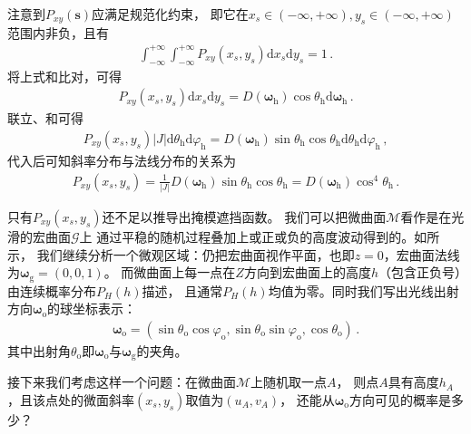 注意到$P_{xy}({\bm s})$应满足规范化约束，
即它在$x_s\in(-\infty,+\infty),y_s\in(-\infty,+\infty)$范围内非负，且有
\begin{align}\label{eq:08-ex01-normal-of-P2D}
    \int_{-\infty}^{+\infty}\int_{-\infty}^{+\infty}
    P_{xy}(x_s,y_s)\mathrm{d}x_s\mathrm{d}y_s=1\, .
\end{align}
将上式和比对，可得
\begin{align}\label{eq:08-ex01-P2D}
    P_{xy}(x_s,y_s)\mathrm{d}x_s\mathrm{d}y_s=
    D({\bm\omega}_{\mathrm{h}})\cos\theta_{\mathrm{h}}\mathrm{d}{\bm\omega}_{\mathrm{h}}\, .
\end{align}
联立、和可得
\begin{align}
    P_{xy}(x_s,y_s)|J|\mathrm{d}\theta_{\mathrm{h}}\mathrm{d}\varphi_{\mathrm{h}}
    =D({\bm\omega}_{\mathrm{h}})\sin\theta_{\mathrm{h}}\cos\theta_{\mathrm{h}}\mathrm{d}\theta_{\mathrm{h}}\mathrm{d}\varphi_{\mathrm{h}}\, ,
\end{align}
代入后可知斜率分布与法线分布的关系为
\begin{align}\label{eq:08-ex01-relation-P2D-McrofacetDistribution}
    P_{xy}(x_s,y_s)=\frac{1}{|J|}D({\bm\omega}_{\mathrm{h}})\sin\theta_{\mathrm{h}}\cos\theta_{\mathrm{h}}
    =D({\bm\omega}_{\mathrm{h}})\cos^4\theta_{\mathrm{h}}\, .
\end{align}

只有$P_{xy}(x_s,y_s)$还不足以推导出掩模遮挡函数。
我们可以把微曲面$\mathcal{M}$看作是在光滑的宏曲面$\mathcal{G}$上
通过平稳的随机过程叠加上或正或负的高度波动得到的。如所示，
我们继续分析一个微观区域：仍把宏曲面视作平面，也即$z=0$，宏曲面法线为${\bm\omega}_{\mathrm{g}}=(0,0,1)$。
而微曲面上每一点在$Z$方向到宏曲面上的高度$h$（包含正负号）由连续概率分布$P_H(h)$描述，
且通常$P_H(h)$均值为零。同时我们写出光线出射方向${\bm\omega}_{\mathrm{o}}$的球坐标表示：
\begin{align}
    {\bm\omega}_{\mathrm{o}}=(\sin\theta_{\mathrm{o}}\cos\varphi_{\mathrm{o}},\sin\theta_{\mathrm{o}}\sin\varphi_{\mathrm{o}},\cos\theta_{\mathrm{o}})\, .
\end{align}
其中出射角$\theta_{\mathrm{o}}$即${\bm\omega}_{\mathrm{o}}$与${\bm\omega}_{\mathrm{g}}$的夹角。

接下来我们考虑这样一个问题：在微曲面$\mathcal{M}$上随机取一点$A$，
则点$A$具有高度$h_A$，且该点处的微面斜率$(x_s,y_s)$取值为$(u_A,v_A)$，
还能从${\bm\omega}_{\mathrm{o}}$方向可见的概率是多少？

